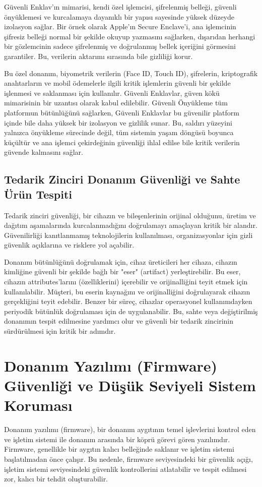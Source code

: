 Güvenli Enklav'ın mimarisi, kendi özel işlemcisi, şifrelenmiş belleği, güvenli önyüklemesi ve kurcalamaya dayanıklı bir yapısı sayesinde yüksek düzeyde izolasyon sağlar. Bir örnek olarak Apple'ın Secure Enclave'i, ana işlemcinin şifresiz belleği normal bir şekilde okuyup yazmasını sağlarken, dışarıdan herhangi bir gözlemcinin sadece şifrelenmiş ve doğrulanmış bellek içeriğini görmesini garantiler. Bu, verilerin aktarımı sırasında bile gizliliği korur.

Bu özel donanım, biyometrik verilerin (Face ID, Touch ID), şifrelerin, kriptografik anahtarların ve mobil ödemelerle ilgili kritik işlemlerin güvenli bir şekilde işlenmesi ve saklanması için kullanılır. Güvenli Enklavlar, güven kökü mimarisinin bir uzantısı olarak kabul edilebilir. Güvenli Önyükleme tüm platformun bütünlüğünü sağlarken, Güvenli Enklavlar bu güvenilir platform içinde bile daha yüksek bir izolasyon ve gizlilik sunar. Bu, saldırı yüzeyini yalnızca önyükleme sürecinde değil, tüm sistemin yaşam döngüsü boyunca küçültür ve ana işlemci çekirdeğinin güvenliği ihlal edilse bile kritik verilerin güvende kalmasını sağlar.

\subsection{Tedarik Zinciri Donanım Güvenliği ve Sahte Ürün Tespiti}

Tedarik zinciri güvenliği, bir cihazın ve bileşenlerinin orijinal olduğunu, üretim ve dağıtım aşamalarında kurcalanmadığını doğrulamayı amaçlayan kritik bir alandır. Güvenilirliği kanıtlanmamış teknolojilerin kullanılması, organizasyonlar için gizli güvenlik açıklarına ve risklere yol açabilir.

Donanım bütünlüğünü doğrulamak için, cihaz üreticileri her cihaza, cihazın kimliğine güvenli bir şekilde bağlı bir "eser" (artifact) yerleştirebilir. Bu eser, cihazın attributes'larını (özelliklerini) içerebilir ve orijinalliğini teyit etmek için kullanılabilir. Müşteri, bu eserin kaynağını ve orijinalliğini doğrulayarak cihazın gerçekliğini teyit edebilir. Benzer bir süreç, cihazlar operasyonel kullanımdayken periyodik bütünlük doğrulaması için de uygulanabilir. Bu, sahte veya değiştirilmiş donanımın tespit edilmesine yardımcı olur ve güvenli bir tedarik zincirinin sürdürülmesi için kritik bir adımdır.

\section{Donanım Yazılımı (Firmware) Güvenliği ve Düşük Seviyeli Sistem Koruması}
Donanım yazılımı (firmware), bir donanım aygıtının temel işlevlerini kontrol eden ve işletim sistemi ile donanım arasında bir köprü görevi gören yazılımdır. Firmware, genellikle bir aygıtın kalıcı belleğinde saklanır ve işletim sistemi başlatılmadan önce çalışır. Bu nedenle, firmware seviyesindeki bir güvenlik açığı, işletim sistemi seviyesindeki güvenlik kontrollerini atlatabilir ve tespit edilmesi zor, kalıcı bir tehdit oluşturabilir.

